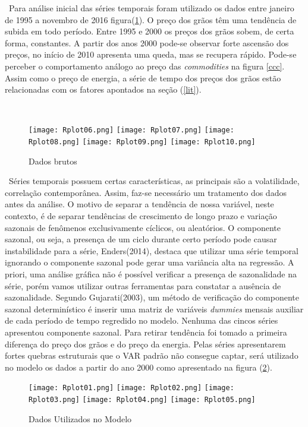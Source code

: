 \documentclass[a4paper,12pt,oneside,titlepage]{article}
\begin{document}
\ Para análise inicial das séries temporais foram utilizado os dados entre janeiro de 1995 a novembro de 2016 figura(\ref{brutos}). O preço dos grãos têm uma tendência de subida em todo período. Entre 1995 e 2000 os preços dos grãos sobem, de certa forma, constantes. A partir dos anos 2000 pode-se observar forte ascensão dos preços, no início de 2010 apresenta uma queda, mas se recupera rápido. Pode-se perceber o comportamento análogo ao preço das \textit{commodities} na figura \ref{ccc}. Assim como o preço de energia, a série de tempo dos preços dos grãos estão relacionadas com os fatores apontados na seção (\ref{lit}).    

\ 

\begin{figure}[H]
	\caption{Dados brutos}
	\texttt{[image: Rplot06.png]}
	\texttt{[image: Rplot07.png]}
	\texttt{[image: Rplot08.png]}
	\texttt{[image: Rplot09.png]}
	\texttt{[image: Rplot10.png]}
	\label{brutos}
\end{figure} 
\ Séries temporais possuem certas características, as principais são a volatilidade, correlação contemporânea. Assim, faz-se necessário um tratamento dos dados antes da análise. O motivo de separar a tendência de nossa variável, neste contexto, é de separar tendências de crescimento de longo prazo e variação sazonais de fenômenos exclusivamente cíclicos, ou aleatórios. 
O componente sazonal, ou seja, a presença de um ciclo durante
certo período pode causar instabilidade para a série, Enders(2014), destaca que utilizar uma série temporal ignorando o componente sazonal pode gerar uma variância alta na regressão. A priori, uma análise gráfica não é possível verificar a presença de sazonalidade na série, porém vamos utilizar outras ferramentas para constatar a ausência de sazonalidade. Segundo Gujarati(2003), um método de verificação do componente sazonal determinístico é inserir uma matriz de variáveis \textit{dummies} mensais auxiliar de cada período de tempo regredido no modelo. Nenhuma das cincos séries apresentou componente sazonal. Para retirar tendência foi tomado a primeira diferença do preço dos grãos e do preço da energia. Pelas séries apresentarem fortes quebras estruturais que o VAR padrão não consegue captar, será utilizado no modelo os dados a partir do ano 2000 como apresentado na figura (\ref{tratados}).

\begin{figure}[H]
	\caption{Dados Utilizados no Modelo}
	\texttt{[image: Rplot01.png]}
	\texttt{[image: Rplot02.png]}
\texttt{[image: Rplot03.png]}
\texttt{[image: Rplot04.png]}
\texttt{[image: Rplot05.png]}
	\label{tratados}
\end{figure}  
\end{document}
